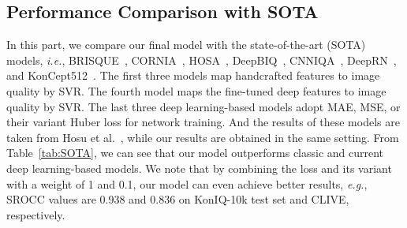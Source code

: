\documentclass[sigconf]{acmart}
\begin{document}
\begin{table}[!htb]
\centering
\caption{Performance comparison with SOTA on KonIQ-10k test set and the whole CLIVE}
\label{tab:SOTA}
\end{table}

\subsection{Performance Comparison with SOTA} 
In this part, we compare our final model with the state-of-the-art (SOTA) models, \textit{i.e.}, BRISQUE~\cite{mittal2012no}, CORNIA~\cite{ye2012unsupervised}, HOSA~\cite{xu2016blind}, DeepBIQ~\cite{bianco2018use}, CNNIQA~\cite{kang2014convolutional}, DeepRN~\cite{varga2018deeprn}, and KonCept512~\cite{hosu2019koniq}.
The first three models map handcrafted features to image quality by SVR.
The fourth model maps the fine-tuned deep features to image quality by SVR.
The last three deep learning-based models adopt MAE, MSE, or their variant Huber loss for network training. 
And the results of these models are taken from Hosu et al.~, while our results are obtained in the same setting.
From Table~\ref{tab:SOTA}, we can see that our model outperforms classic and current deep learning-based models. 
We note that by combining the loss and its variant with a weight of 1 and 0.1, our model can even achieve better results, \textit{e.g.}, SROCC values are 0.938 and 0.836 on KonIQ-10k test set and CLIVE, respectively.
\end{document}
